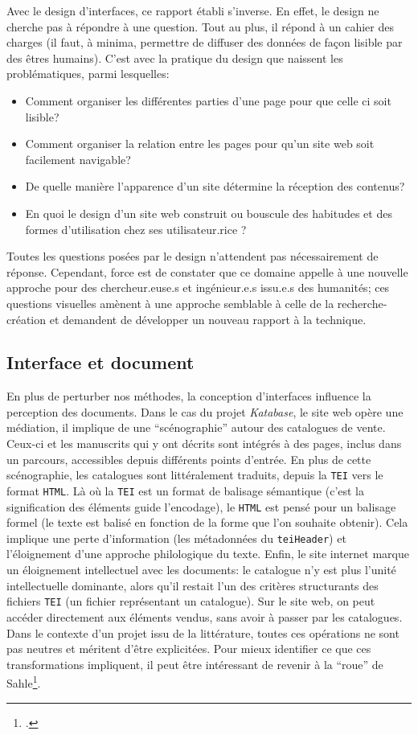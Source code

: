 \documentclass[a4paper, 12pt, twoside]{book}
\newcommand{\html}{\texttt{HTML}}
\newcommand{\ktb}{\textit{Katabase}}
\newcommand{\tei}{\texttt{TEI}}
\begin{document}
Avec le design d'interfaces, ce rapport établi s'inverse. En effet, le design ne cherche pas à répondre à une question. Tout au plus, il répond à un cahier des charges (il faut, à minima, permettre de diffuser des données de façon lisible par des êtres humains). C'est avec la pratique du design que naissent les problématiques, parmi lesquelles: 
\begin{itemize}
	\item Comment organiser les différentes parties d'une page pour que celle ci soit lisible? 
	\item Comment organiser la relation entre les pages pour qu'un site web soit facilement navigable? 
	\item De quelle manière l'apparence d'un site détermine la réception des contenus?
	\item En quoi le design d'un site web construit ou bouscule des habitudes et des formes d'utilisation chez ses utilisateur.rice ?
\end{itemize}
Toutes les questions posées par le design n'attendent pas nécessairement de réponse. Cependant, force est de constater que ce domaine appelle à une nouvelle approche pour des chercheur.euse.s et ingénieur.e.s issu.e.s des humanités; ces questions visuelles amènent à une approche semblable à celle de la recherche-création et demandent de développer un nouveau rapport à la technique.

\subsection{Interface et document}
En plus de perturber nos méthodes, la conception d'interfaces influence la perception des documents. Dans le cas du projet \ktb, le site web opère une médiation, il implique de une \enquote{scénographie} autour des catalogues de vente. Ceux-ci et les manuscrits qui y ont décrits sont intégrés à des pages, inclus dans un parcours, accessibles depuis différents points d'entrée. En plus de cette scénographie, les catalogues sont littéralement traduits, depuis la \tei{} vers le format \html{}. Là où la \tei{} est un format de balisage sémantique (c'est la signification des éléments guide l'encodage), le \html{} est pensé pour un balisage formel (le texte est balisé en fonction de la forme que l'on souhaite obtenir). Cela implique une perte d'information (les métadonnées du \texttt{teiHeader}) et l'éloignement d'une approche philologique du texte. Enfin, le site internet marque un éloignement intellectuel avec les documents: le catalogue n'y est plus l'unité intellectuelle dominante, alors qu'il restait l'un des critères structurants des fichiers \tei{} (un fichier représentant un catalogue). Sur le site web, on peut accéder directement aux éléments vendus, sans avoir à passer par les catalogues. Dans le contexte d'un projet issu de la littérature, toutes ces opérations ne sont pas neutres et méritent d'être explicitées. Pour mieux identifier ce que ces transformations impliquent, il peut être intéressant de revenir à la \enquote{roue} de Sahle\footcite[p. 11]{sahle_digital_2016}.
\end{document}

